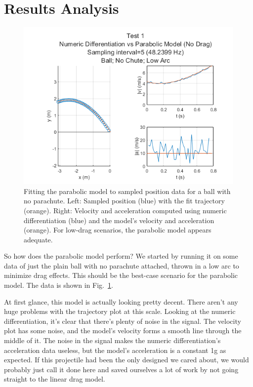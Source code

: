 \section{Results Analysis}


\begin{figure}[t]
\centering
\includegraphics[width=0.9\linewidth]{images/Analysis1_Test1_Fig5_NoDrag.png}
\caption{\label{fig:Analysis1_Test1_Fig5_NoDrag} Fitting the parabolic model to sampled position data for a ball with no parachute. Left: Sampled position (blue) with the fit trajectory (orange). Right: Velocity and acceleration computed using numeric differentiation (blue) and the model's velocity and acceleration (orange). For low-drag scenarios, the parabolic model appears adequate.}
\end{figure}

So how does the parabolic model perform? We started by running it on some data of just the plain ball with no parachute attached, thrown in a low arc to minimize drag effects. This should be the best-case scenario for the parabolic model. The data is shown in Fig.~\ref{fig:Analysis1_Test1_Fig5_NoDrag}. 

At first glance, this model is actually looking pretty decent. There aren't any huge problems with the trajectory plot at this scale. Looking at the numeric differentiation, it's clear that there's plenty of noise in the signal. The velocity plot has some noise, and the model's velocity forms a smooth line through the middle of it. The noise in the signal makes the numeric differentiation's acceleration data useless, but the model's acceleration is a constant 1g as expected. If this projectile had been the only designed we cared about, we would probably just call it done here and saved ourselves a lot of work by not going straight to the linear drag model. 

